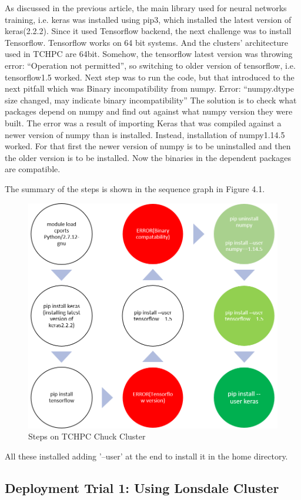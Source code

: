 As discussed in the previous article, the main library used for neural networks training, i.e. keras was installed using pip3, which installed the latest version of keras(2.2.2). Since it used Tensorflow backend, the next challenge was to install Tensorflow. Tensorflow works on 64 bit systems. And the clusters’ architecture used in TCHPC are 64bit.
Somehow, the tensorflow latest version was throwing error: “Operation not permitted”, so switching to older version of tensorflow, i.e. tensorflow1.5 worked. Next step was to run the code, but that introduced to the next pitfall which was Binary incompatibility from numpy. Error:
“numpy.dtype size changed, may indicate binary incompatibility”
The solution is to check what packages depend on numpy and find out against what numpy version they were built. The error was a result of importing Keras that was compiled against a newer version of numpy than is installed.  Instead, installation of numpy1.14.5 worked. For that first the newer version of numpy is to be uninstalled and then the older version is to be installed. Now the binaries in the dependent packages are compatible. 


The summary of the steps is shown in the sequence graph in Figure 4.1.

\begin{figure}
	\centering%
	\includegraphics[width=0.8\columnwidth]{introduction/fig4a.png}
	\caption{Steps on TCHPC Chuck Cluster}
\end{figure}

All these installed adding '--user' at the end to install it in the home directory.

\subsection{Deployment Trial 1: Using Lonsdale Cluster}

